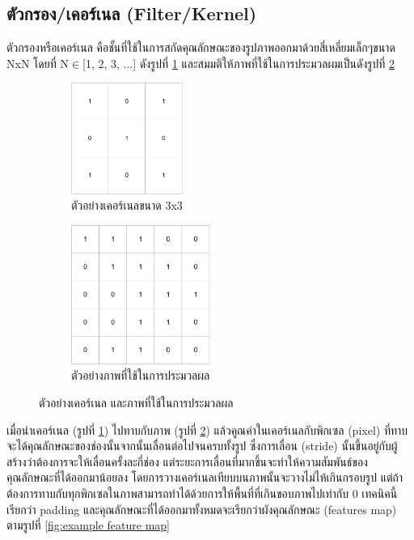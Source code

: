 \subsection*{ตัวกรอง/เคอร์เนล (Filter/Kernel)}
ตัวกรองหรือเคอร์เนล คือชั้นที่ใช้ในการสกัดคุณลักษณะของรูปภาพออกมาด้วยสี่เหลี่ยมเล็กๆขนาด NxN โดยที่ N$\in$[1, 2, 3, ...] ดังรูปที่ \ref{fig:kernel_3x3} 
และสมมติให้ภาพที่ใช้ในการประมวลผมเป็นดังรูปที่ \ref{fig:input_ex}
\begin{figure}[!ht]
	\centering
	\begin{subfigure}[b]{0.5\textwidth}
        \centering
        \includegraphics[width=0.4\textwidth]{chapter2/images/kernel_ex.png}
		\caption{ตัวอย่างเคอร์เนลขนาด 3x3}
		\label{fig:kernel_3x3}
    \end{subfigure}
    \begin{subfigure}[b]{0.5\textwidth}
        \centering
		\includegraphics[width=0.5\textwidth]{chapter2/images/input_ex.png}
		\caption{ตัวอย่างภาพที่ใช้ในการประมวลผล}
        \label{fig:input_ex}
	\end{subfigure}
	\caption{ตัวอย่างเคอร์เนล และภาพที่ใช้ในการประมวลผล}
	\label{fig:kernel_input_ex}
\end{figure}
\clearpage
เมื่อนำเคอร์เนล (รูปที่ \ref{fig:kernel_3x3}) ไปทาบกับภาพ (รูปที่ \ref{fig:input_ex}) แล้วคูณค่าในเคอร์เนลกับพิกเซล (pixel) ที่ทาบจะได้คุณลักษณะของช่องนั้นจากนั้นเลื่อนต่อไปจนครบทั้งรูป 
ซึ่งการเลื่อน (stride) นั้นขึ้นอยู่กับผู้สร้างว่าต้องการจะให้เลื่อนครั้งละกี่ช่อง แต่ระยะการเลื่อนที่มากขึ้นจะทำให้ความสัมพันธ์ของคุณลักษณะที่ได้ออกมาน้อยลง โดยการวางเคอร์เนลเทียบบนภาพนั้นจะวางไม่ไห้เกินกรอบรูป 
แต่ถ้าต้องการทาบกับทุกพิกเซลในภาพสามารถทำได้ด้วยการให้พื้นที่ที่เกินขอบภาพไปเท่ากับ 0 เทคนิคนี้เรียกว่า padding และคุณลักษณะที่ได้ออกมาทั้งหมดจะเรียกว่าผังคุณลักษณะ (features map) ตามรูปที่ \ref{fig:example feature map}


